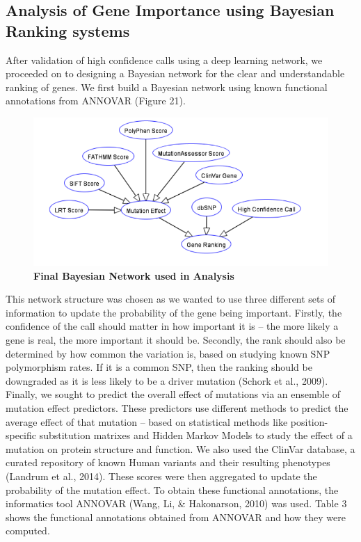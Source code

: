 \documentclass{article}
\begin{document}
\subsection{Analysis of Gene Importance using Bayesian Ranking systems}
After validation of high confidence calls using a deep learning network, we proceeded on to designing a Bayesian network for the clear and understandable ranking of genes. We first build a Bayesian network using known functional annotations from ANNOVAR (Figure 21). 


\begin{figure}[H]
\includegraphics[width=\textwidth]{bayesiannetwork.png}
\caption{\textbf{Final Bayesian Network used in Analysis}}
\centering
\end{figure}

This network structure was chosen as we wanted to use three different sets of information to update the probability of the gene being important. Firstly, the confidence of the call should matter in how important it is -- the more likely a gene is real, the more important it should be. Secondly, the rank should also be determined by how common the variation is, based on studying known SNP polymorphism rates. If it is a common SNP, then the ranking should be downgraded as it is less likely to be a driver mutation (Schork et al., 2009). Finally, we sought to predict the overall effect of mutations via an ensemble of mutation effect predictors. These predictors use different methods to predict the average effect of that mutation -- based on statistical methods like position-specific substitution matrixes and Hidden Markov Models to study the effect of a mutation on protein structure and function. We also used the ClinVar database, a curated repository of known Human variants and their resulting phenotypes (Landrum et al., 2014). These scores were then aggregated to update the probability of the mutation effect. To obtain these functional annotations, the informatics tool ANNOVAR (Wang, Li, \& Hakonarson, 2010) was used. Table 3 shows the functional annotations obtained from ANNOVAR and how they were computed.
\end{document}
